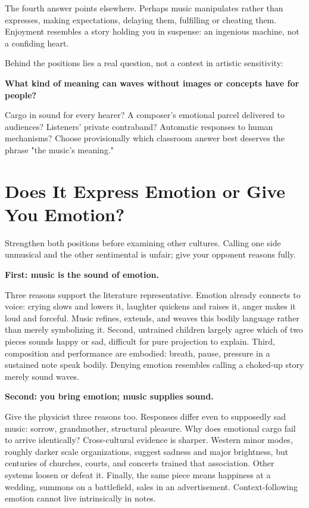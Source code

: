 The fourth answer points elsewhere. Perhaps music manipulates rather than expresses, making expectations, delaying them, fulfilling or cheating them. Enjoyment resembles a story holding you in suspense: an ingenious machine, not a confiding heart.

Behind the positions lies a real question, not a contest in artistic sensitivity:

\textbf{What kind of meaning can waves without images or concepts have for people?}

Cargo in sound for every hearer? A composer's emotional parcel delivered to audiences? Listeners' private contraband? Automatic responses to human mechanisms? Choose provisionally which classroom answer best deserves the phrase "the music's meaning."

\section[Expression or Induced Emotion?]{Does It Express Emotion or Give You Emotion?}
Strengthen both positions before examining other cultures. Calling one side unmusical and the other sentimental is unfair; give your opponent reasons fully.

\textbf{First: music is the sound of emotion.}

Three reasons support the literature representative. Emotion already connects to voice: crying slows and lowers it, laughter quickens and raises it, anger makes it loud and forceful. Music refines, extends, and weaves this bodily language rather than merely symbolizing it. Second, untrained children largely agree which of two pieces sounds happy or sad, difficult for pure projection to explain. Third, composition and performance are embodied: breath, pause, pressure in a sustained note speak bodily. Denying emotion resembles calling a choked-up story merely sound waves.

\textbf{Second: you bring emotion; music supplies sound.}

Give the physicist three reasons too. Responses differ even to supposedly sad music: sorrow, grandmother, structural pleasure. Why does emotional cargo fail to arrive identically? Cross-cultural evidence is sharper. Western minor modes, roughly darker scale organizations, suggest sadness and major brightness, but centuries of churches, courts, and concerts trained that association. Other systems loosen or defeat it. Finally, the same piece means happiness at a wedding, summons on a battlefield, sales in an advertisement. Context-following emotion cannot live intrinsically in notes.

